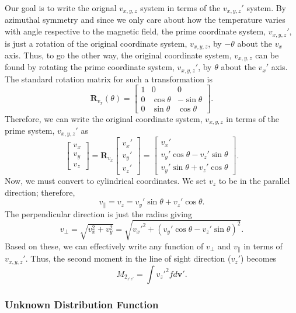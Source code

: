 Our goal is to write the orignal $v_{x,y,z}$ system in terms of the $v_{x,y,z}'$ system. 
By azimuthal symmetry and since we only care about how the temperature varies with angle respective to the magnetic field, the prime coordinate system, $v_{x,y,z}'$, is just a rotation of the original coordinate system, $v_{x,y,z}$, by $-\theta$ about the $v_x$ axis. 
Thus, to go the other way, the original coordinate system, $v_{x,y,z}$ can be found by rotating the prime coordinate system, $v_{x,y,z}'$, by $\theta$ about the $v_x'$ axis.
The standard rotation matrix for such a transformation is
\begin{equation}
	\mathbf{R}_{v_x}(\theta) = \begin{bmatrix}
		1 & 0 & 0 \\
		0 & \cos\theta & -\sin\theta \\
		0 & \sin\theta & \cos\theta
	\end{bmatrix}.
	\label{eq:rot_mat}
\end{equation}
Therefore, we can write the original coordinate system, $v_{x,y,z}$ in terms of the prime system, $v_{x,y,z}'$ as
\begin{equation}
	\begin{bmatrix}
		v_x \\ v_y \\ v_z
	\end{bmatrix} = 
	\mathbf{R}_{v_x} \begin{bmatrix}
		v_x' \\ v_y' \\ v_z'
	\end{bmatrix} = 
	\begin{bmatrix}
		v_x' \\
		v_y'\cos\theta - v_z'\sin\theta \\
		v_y'\sin\theta + v_z'\cos\theta
	\end{bmatrix}.
\end{equation}
Now, we must convert to cylindrical coordinates. 
We set $v_z$ to be in the parallel direction; therefore,
\begin{equation}
	v_\parallel = v_z = v_y'\sin\theta + v_z'\cos\theta.
\end{equation}
The perpendicular direction is just the radius giving
\begin{equation}
	v_\perp = \sqrt{v_x^2+v_y^2}
	= \sqrt{v_x'^2 + (v_y'\cos\theta - v_z'\sin\theta)^2 }.
\end{equation}
Based on these, we can effectively write any function of $v_\perp$ and $v_\parallel$ in terms of $v_{x,y,z}'$.
Thus, the second moment in the line of sight direction ($v_z'$) becomes
\begin{equation}
	M_{2_{z'z'}} = \int v_z'^2 f d\mathbf{v}'.
\end{equation}


\subsubsection{Unknown Distribution Function}

